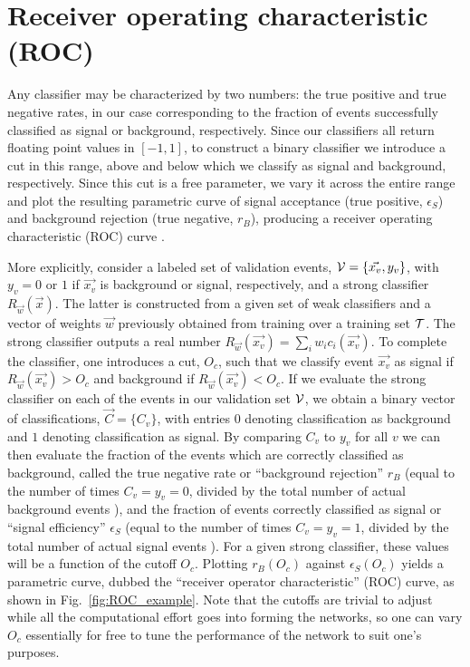 \documentclass[.chapters/Higgs/.chapters/Higgs/main.tex]{subfiles}
\begin{document}
\section*{Receiver operating characteristic (ROC)}
Any classifier may be characterized by two numbers: the true positive and true negative rates, in our case corresponding to the fraction of events successfully classified as signal or background, respectively. Since our classifiers all return floating point values in $[-1,1]$, to construct a binary classifier we introduce a cut in this range, above and below which we classify as signal and background, respectively. Since this cut is a free parameter, we vary it across the entire range and plot the resulting parametric curve of signal acceptance (true positive, $\epsilon_S$) and background rejection (true negative, $r_B$), producing a receiver operating characteristic (ROC) curve \cite{Hanley:1982}. 

More explicitly, consider a labeled set of validation events, $\mathcal{V}=\{\vec{x_v},y_v\}$, with $y_v=0$ or $1$ if $\vec{x_v}$ is background or signal, respectively, and a strong classifier $R_{\vec{w}}(\vec{x})$. The latter is constructed from a given set of weak classifiers and a vector of weights $\vec{w}$ previously obtained from training over a training set $\mathcal{T}$. The strong classifier outputs a real number $R_{\vec{w}}(\vec{x_v})=\sum_i w_i c_i(\vec{x_v})$. To complete the classifier, one introduces a cut, $O_c$, such that we classify event $\vec{x_v}$ as signal if $R_{\vec{w}}(\vec{x_v})>O_c$ and background if $R_{\vec{w}}(\vec{x_v})<O_c$. If we evaluate the strong classifier on each of the events in our validation set $\mathcal{V}$, we obtain a binary vector of classifications, $\vec{C}=\{C_v\}$, with entries $0$ denoting classification as background and $1$ denoting classification as signal. By comparing $C_v$ to $y_v$ for all $v$ we can then evaluate the fraction of the events which are correctly classified as background, called the true negative rate or ``background rejection'' $r_B$ (equal to the number of times $C_v=y_v=0$, divided by the total number of actual background events
%
), 
and the fraction of events correctly classified as signal or ``signal efficiency'' $\epsilon_S$ (equal to the number of times $C_v=y_v=1$, divided by the total number of actual signal events%
). 
For a given strong classifier, these values will be a function of the cutoff $O_c$. Plotting $r_B(O_c)$ against $\epsilon_S(O_c)$ yields a parametric curve, dubbed the ``receiver operator characteristic'' (ROC) curve, as shown in Fig.~\ref{fig:ROC_example}. Note that the cutoffs are trivial to adjust while all the computational effort goes into forming the networks, so one can vary $O_c$ essentially for free to tune the performance of the network to suit one's purposes. 
\end{document}
